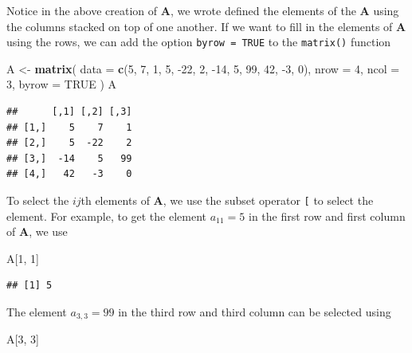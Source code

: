 \documentclass[
]{book}
\newenvironment{Shaded}{\begin{snugshade}}{\end{snugshade}}
\newcommand{\DataTypeTok}[1]{\textcolor[rgb]{0.13,0.29,0.53}{#1}}
\newcommand{\DecValTok}[1]{\textcolor[rgb]{0.00,0.00,0.81}{#1}}
\newcommand{\KeywordTok}[1]{\textcolor[rgb]{0.13,0.29,0.53}{\textbf{#1}}}
\newcommand{\NormalTok}[1]{#1}
\newcommand{\OtherTok}[1]{\textcolor[rgb]{0.56,0.35,0.01}{#1}}
\newcommand{\StringTok}[1]{\textcolor[rgb]{0.31,0.60,0.02}{#1}}
\theoremstyle{definition}
\theoremstyle{definition}
\theoremstyle{definition}
\theoremstyle{definition}
\theoremstyle{remark}
\begin{document}
Notice in the above creation of \(\mathbf{A}\), we wrote defined the elements of the \(\mathbf{A}\) using the columns stacked on top of one another. If we want to fill in the elements of \(\mathbf{A}\) using the rows, we can add the option \texttt{byrow\ =\ TRUE} to the \texttt{matrix()} function

\begin{Shaded}
\begin{Highlighting}[]
\NormalTok{A <-}\StringTok{ }\KeywordTok{matrix}\NormalTok{(}
    \DataTypeTok{data  =} \KeywordTok{c}\NormalTok{(}\DecValTok{5}\NormalTok{, }\DecValTok{7}\NormalTok{, }\DecValTok{1}\NormalTok{, }\DecValTok{5}\NormalTok{, }\DecValTok{-22}\NormalTok{, }\DecValTok{2}\NormalTok{, }\DecValTok{-14}\NormalTok{, }\DecValTok{5}\NormalTok{, }\DecValTok{99}\NormalTok{, }\DecValTok{42}\NormalTok{, }\DecValTok{-3}\NormalTok{, }\DecValTok{0}\NormalTok{), }
    \DataTypeTok{nrow  =} \DecValTok{4}\NormalTok{,}
    \DataTypeTok{ncol  =} \DecValTok{3}\NormalTok{,}
    \DataTypeTok{byrow =} \OtherTok{TRUE}
\NormalTok{)}
\NormalTok{A}
\end{Highlighting}
\end{Shaded}

\begin{verbatim}
##      [,1] [,2] [,3]
## [1,]    5    7    1
## [2,]    5  -22    2
## [3,]  -14    5   99
## [4,]   42   -3    0
\end{verbatim}

To select the \(ij\)th elements of \(\mathbf{A}\), we use the subset operator \texttt{{[}} to select the element. For example, to get the element \(a_{11} = 5\) in the first row and first column of \(\mathbf{A}\), we use

\begin{Shaded}
\begin{Highlighting}[]
\NormalTok{A[}\DecValTok{1}\NormalTok{, }\DecValTok{1}\NormalTok{]}
\end{Highlighting}
\end{Shaded}

\begin{verbatim}
## [1] 5
\end{verbatim}

The element \(a_{3, 3} = 99\) in the third row and third column can be selected using

\begin{Shaded}
\begin{Highlighting}[]
\NormalTok{A[}\DecValTok{3}\NormalTok{, }\DecValTok{3}\NormalTok{]}
\end{Highlighting}
\end{Shaded}
\end{document}
